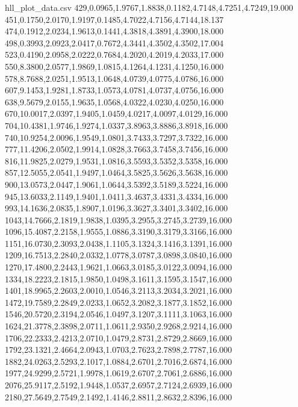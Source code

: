 \documentclass[11pt,letterpaper]{article}
\begin{document}
\begin{filecontents*}{hll_plot_data.csv}
429,0.0965,1.9767,1.8838,0.1182,4.7148,4.7251,4.7249,19.000
451,0.1750,2.0170,1.9197,0.1485,4.7022,4.7156,4.7144,18.137
474,0.1912,2.0234,1.9613,0.1441,4.3818,4.3891,4.3900,18.000
498,0.3993,2.0923,2.0417,0.7672,4.3441,4.3502,4.3502,17.004
523,0.4190,2.0958,2.0222,0.7684,4.2020,4.2019,4.2033,17.000
550,8.3800,2.0577,1.9869,1.0815,4.1264,4.1231,4.1250,16.000
578,8.7688,2.0251,1.9513,1.0648,4.0739,4.0775,4.0786,16.000
607,9.1453,1.9281,1.8733,1.0573,4.0781,4.0737,4.0756,16.000
638,9.5679,2.0155,1.9635,1.0568,4.0322,4.0230,4.0250,16.000
670,10.0017,2.0397,1.9405,1.0459,4.0217,4.0097,4.0129,16.000
704,10.4381,1.9746,1.9274,1.0337,3.8963,3.8886,3.8918,16.000
740,10.9254,2.0096,1.9549,1.0801,3.7433,3.7297,3.7322,16.000
777,11.4206,2.0502,1.9914,1.0828,3.7663,3.7458,3.7456,16.000
816,11.9825,2.0279,1.9531,1.0816,3.5593,3.5352,3.5358,16.000
857,12.5055,2.0541,1.9497,1.0464,3.5825,3.5626,3.5638,16.000
900,13.0573,2.0447,1.9061,1.0644,3.5392,3.5189,3.5224,16.000
945,13.6033,2.1149,1.9401,1.0411,3.4637,3.4331,3.4334,16.000
993,14.1636,2.0835,1.8907,1.0196,3.3627,3.3401,3.3402,16.000
1043,14.7666,2.1819,1.9838,1.0395,3.2955,3.2745,3.2739,16.000
1096,15.4087,2.2158,1.9555,1.0886,3.3190,3.3179,3.3166,16.000
1151,16.0730,2.3093,2.0438,1.1105,3.1324,3.1416,3.1391,16.000
1209,16.7513,2.2840,2.0332,1.0778,3.0787,3.0898,3.0840,16.000
1270,17.4800,2.2443,1.9621,1.0663,3.0185,3.0122,3.0094,16.000
1334,18.2223,2.1815,1.9850,1.0498,3.1611,3.1595,3.1547,16.000
1401,18.9965,2.2603,2.0010,1.0546,3.2113,3.2034,3.2021,16.000
1472,19.7589,2.2849,2.0233,1.0652,3.2082,3.1877,3.1852,16.000
1546,20.5720,2.3194,2.0546,1.0497,3.1207,3.1111,3.1063,16.000
1624,21.3778,2.3898,2.0711,1.0611,2.9350,2.9268,2.9214,16.000
1706,22.2333,2.4213,2.0710,1.0479,2.8731,2.8729,2.8669,16.000
1792,23.1321,2.4664,2.0943,1.0703,2.7623,2.7898,2.7787,16.000
1882,24.0263,2.5293,2.1017,1.0884,2.6701,2.7016,2.6874,16.000
1977,24.9299,2.5721,1.9978,1.0619,2.6707,2.7061,2.6886,16.000
2076,25.9117,2.5192,1.9448,1.0537,2.6957,2.7124,2.6939,16.000
2180,27.5649,2.7549,2.1492,1.4146,2.8811,2.8632,2.8396,16.000
\end{filecontents*}
\end{document}
